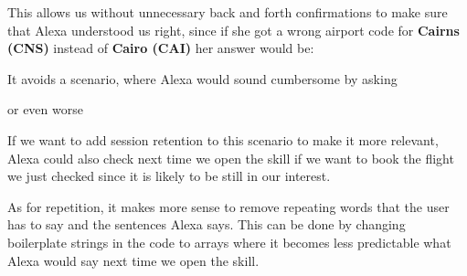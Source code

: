 \noindent This allows us without unnecessary back and forth confirmations to make sure that Alexa understood us right, since if she got a wrong airport code for \textbf{Cairns (CNS)} instead of \textbf{Cairo (CAI)} her answer would be:

\begin{flushright}
\end{flushright}



\noindent It avoids a scenario, where Alexa would sound cumbersome by asking

\begin{flushright}
\end{flushright}

\noindent or even worse
\begin{flushright}
\end{flushright}

\noindent If we want to add session retention to this scenario to make it more relevant, Alexa could also check next time we open the skill if we want to book the flight we just checked since it is likely to be still in our interest.

As for repetition, it makes more sense to remove repeating words that the user has to say and the sentences Alexa says. This can be done by changing boilerplate strings in the code to arrays where it becomes less predictable what Alexa would say next time we open the skill.

